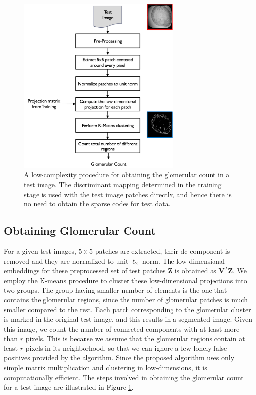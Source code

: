 \begin{figure}[t]
\begin{minipage}[b]{0.99\linewidth}
  \centering
  \includegraphics[width=8cm]{test.png}
\end{minipage}
\caption{A low-complexity procedure for obtaining the glomerular count in a test image. The discriminant mapping determined in the training stage is used with the test image patches directly, and hence there is no need to obtain the sparse codes for test data.}
\label{Fig:test}
\end{figure}

\subsection{Obtaining Glomerular Count}
\label{sec:count}
For a given test images, $5 \times 5$ patches are extracted, their dc component is removed and they are normalized to unit $\ell_2$ norm. The low-dimensional embeddings for these preprocessed set of test patches $\mathbf{Z}$ is obtained as $\mathbf{V}^T \mathbf{Z}$. We employ the K-means procedure to cluster these low-dimensional projections into two groups. The group having smaller number of elements is the one that contains the glomerular regions, since the number of glomerular patches is much smaller compared to the rest. Each patch corresponding to the glomerular cluster is marked in the original test image, and this results in a segmented image. Given this image, we count the number of connected components with at least more than $r$ pixels. This is because we assume that the glomerular regions contain at least $r$ pixels in its neighborhood, so that we can ignore a few lonely false positives provided by the algorithm. Since the proposed algorithm uses only simple matrix multiplication and clustering in low-dimensions, it is computationally efficient. The steps involved in obtaining the glomerular count for a test image are illustrated in Figure \ref{Fig:test}.